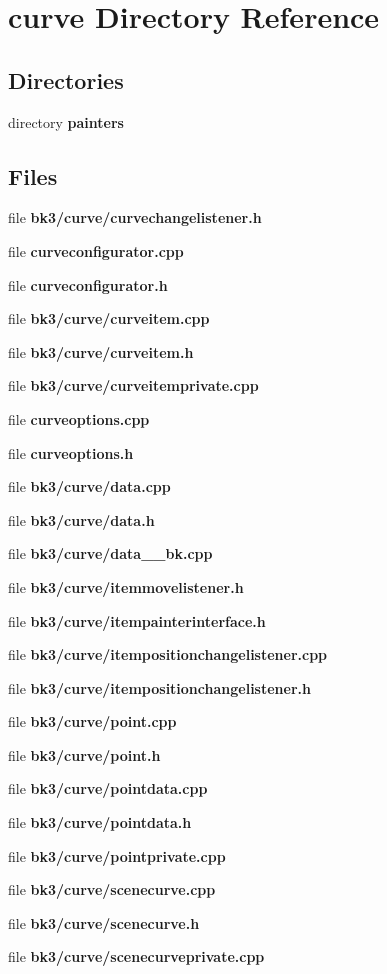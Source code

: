 \section{curve Directory Reference}
\label{dir_b6ebac6fac20d57717fb7a098ce07b98}
\subsection*{Directories}
\begin{DoxyCompactItemize}
\item 
directory {\bf painters}
\end{DoxyCompactItemize}
\subsection*{Files}
\begin{DoxyCompactItemize}
\item 
file {\bf bk3/curve/curvechangelistener.\+h}
\item 
file {\bf curveconfigurator.\+cpp}
\item 
file {\bf curveconfigurator.\+h}
\item 
file {\bf bk3/curve/curveitem.\+cpp}
\item 
file {\bf bk3/curve/curveitem.\+h}
\item 
file {\bf bk3/curve/curveitemprivate.\+cpp}
\item 
file {\bf curveoptions.\+cpp}
\item 
file {\bf curveoptions.\+h}
\item 
file {\bf bk3/curve/data.\+cpp}
\item 
file {\bf bk3/curve/data.\+h}
\item 
file {\bf bk3/curve/data\+\_\+\+\_\+bk.\+cpp}
\item 
file {\bf bk3/curve/itemmovelistener.\+h}
\item 
file {\bf bk3/curve/itempainterinterface.\+h}
\item 
file {\bf bk3/curve/itempositionchangelistener.\+cpp}
\item 
file {\bf bk3/curve/itempositionchangelistener.\+h}
\item 
file {\bf bk3/curve/point.\+cpp}
\item 
file {\bf bk3/curve/point.\+h}
\item 
file {\bf bk3/curve/pointdata.\+cpp}
\item 
file {\bf bk3/curve/pointdata.\+h}
\item 
file {\bf bk3/curve/pointprivate.\+cpp}
\item 
file {\bf bk3/curve/scenecurve.\+cpp}
\item 
file {\bf bk3/curve/scenecurve.\+h}
\item 
file {\bf bk3/curve/scenecurveprivate.\+cpp}
\end{DoxyCompactItemize}
